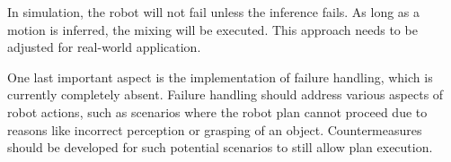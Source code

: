 In simulation, the robot will not fail unless the inference fails. As long as a motion is inferred, the mixing will be executed. This approach needs to be adjusted for real-world application.

One last important aspect is the implementation of failure handling, which is currently completely absent. Failure handling should address various aspects of robot actions, such as scenarios where the robot plan cannot proceed due to reasons like incorrect perception or grasping of an object. Countermeasures should be developed for such potential scenarios to still allow plan execution.
